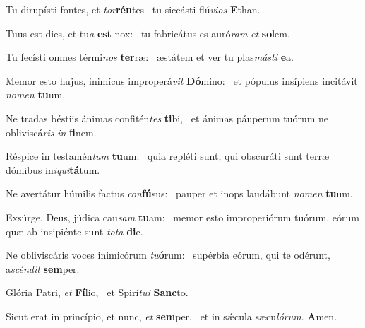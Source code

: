 \item Tu dirupísti fontes, et \textit{tor}\textbf{rén}tes~\psstar{} tu siccásti flú\textit{vios} \textbf{E}than.
\item Tuus est dies, et tu\textit{a} \textbf{est} nox:~\psstar{} tu fabricátus es auró\textit{ram} \textit{et} \textbf{so}lem.
\item Tu fecísti omnes térmi\textit{nos} \textbf{ter}ræ:~\psstar{} æstátem et ver tu plas\textit{másti} \textbf{e}a.
\item Memor esto hujus, inimícus improperá\textit{vit} \textbf{Dó}mino:~\psstar{} et pópulus insípiens incitávit \textit{nomen} \textbf{tu}um.
\item Ne tradas béstiis ánimas confitén\textit{tes} \textbf{ti}bi,~\psstar{} et ánimas páuperum tuórum ne obliviscá\textit{ris} \textit{in} \textbf{fi}nem.
\item Réspice in testamén\textit{tum} \textbf{tu}um:~\psstar{} quia repléti sunt, qui obscuráti sunt terræ dómibus in\textit{iqui}\textbf{tá}tum.
\item Ne avertátur húmilis factus \textit{con}\textbf{fú}sus:~\psstar{} pauper et inops laudábunt \textit{nomen} \textbf{tu}um.
\item Exsúrge, Deus, júdica cau\textit{sam} \textbf{tu}am:~\psstar{} memor esto improperiórum tuórum, eórum quæ ab insipiénte sunt \textit{tota} \textbf{di}e.
\item Ne obliviscáris voces inimicórum \textit{tu}\textbf{ó}rum:~\psstar{} supérbia eórum, qui te odérunt, a\textit{scéndit} \textbf{sem}per.
\item Glória Patri, \textit{et} \textbf{Fí}lio,~\psstar{} et Spirí\textit{tui} \textbf{Sanc}to.
\item Sicut erat in princípio, et nunc, \textit{et} \textbf{sem}per,~\psstar{} et in sǽcula sæcu\textit{lórum}. \textbf{A}men.
